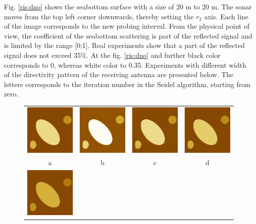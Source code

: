 \documentclass{procDDs}
\begin{document}
Fig. \ref{ris:dno} shows the seabottom surface with a size of 20 m to 20 m. The sonar moves from the top left corner downwards, thereby setting the $ r_2 $ axis. Each line of the image corresponds to the new probing interval. From the physical point of view, the coefficient of the seabottom scattering is part of the reflected signal and is limited by the range [0;1]. Real experiments show that a part of the reflected signal does not exceed 35\%. At the fig. \ref{ris:dno} and further black color corresponds to 0, whereas white color to 0.35. Experiments with different width of the directivity pattern of the receiving antenna are presented below. The letters corresponds to the iteration number in the Seidel algorithm, starting from zero.

\begin{figure}[h!]\center%
	\begin{tabular}{cccc}
		\includegraphics[width=0.2\linewidth]{k-img-5-1.jpg}&
		\includegraphics[width=0.2\linewidth]{k-img-5-3.jpg}&
		\includegraphics[width=0.2\linewidth]{k-img-5-4.jpg}&
		\includegraphics[width=0.2\linewidth]{k-img-5-5.jpg}\\
		a & b & c & d \\
		\includegraphics[width=0.2\linewidth]{k-img-5-6.jpg}&

\end{tabular}
\end{figure}
\end{document}
